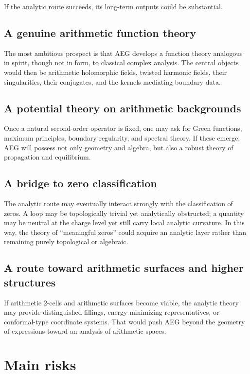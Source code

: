 \documentclass[11pt]{article}
\newcommand{\AEG}{AEG}
\begin{document}
If the analytic route succeeds, its long-term outputs could be substantial.

\subsection{A genuine arithmetic function theory}

The most ambitious prospect is that \AEG{} develops a function theory analogous in spirit, though not in form, to classical complex analysis. The central objects would then be arithmetic holomorphic fields, twisted harmonic fields, their singularities, their conjugates, and the kernels mediating boundary data.

\subsection{A potential theory on arithmetic backgrounds}

Once a natural second-order operator is fixed, one may ask for Green functions, maximum principles, boundary regularity, and spectral theory. If these emerge, \AEG{} will possess not only geometry and algebra, but also a robust theory of propagation and equilibrium.

\subsection{A bridge to zero classification}

The analytic route may eventually interact strongly with the classification of zeros. A loop may be topologically trivial yet analytically obstructed; a quantity may be neutral at the charge level yet still carry local analytic curvature. In this way, the theory of ``meaningful zeros'' could acquire an analytic layer rather than remaining purely topological or algebraic.

\subsection{A route toward arithmetic surfaces and higher structures}

If arithmetic 2-cells and arithmetic surfaces become viable, the analytic theory may provide distinguished fillings, energy-minimizing representatives, or conformal-type coordinate systems. That would push \AEG{} beyond the geometry of expressions toward an analysis of arithmetic spaces.

\section{Main risks}
\end{document}

